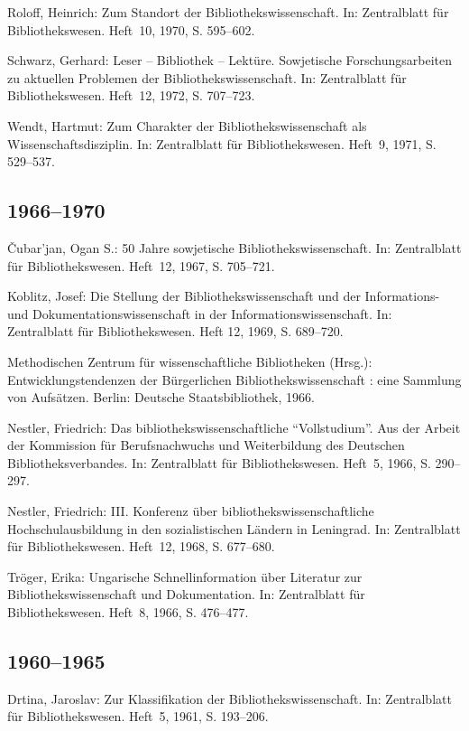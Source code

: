 \documentclass[a4paper,
fontsize=11pt,
oneside,
numbers=noperiodatend,
parskip=half-,
bibliography=totoc,
final
]{scrartcl}
\begin{document}
Roloff, Heinrich: Zum Standort der Bibliothekswissenschaft. In:
Zentralblatt für Bibliothekswesen. Heft~10, 1970, S. 595--602.

Schwarz, Gerhard: Leser -- Bibliothek -- Lektüre. Sowjetische
Forschungsarbeiten zu aktuellen Problemen der Bibliothekswissenschaft.
In: Zentralblatt für Bibliothekswesen. Heft~12, 1972, S. 707--723.

Wendt, Hartmut: Zum Charakter der Bibliothekswissenschaft als
Wissenschaftsdisziplin. In: Zentralblatt für Bibliothekswesen. Heft~9,
1971, S. 529--537.

\hypertarget{section-6}{%
\subsection*{1966--1970}\label{section-6}}

Čubar'jan, Ogan S.: 50 Jahre sowjetische Bibliothekswissenschaft. In:
Zentralblatt für Bibliothekswesen. Heft~12, 1967, S. 705--721.

Koblitz, Josef: Die Stellung der Bibliothekswissenschaft und der
Informations- und Dokumentationswissenschaft in der
Informationswissenschaft. In: Zentralblatt für Bibliothekswesen. Heft
12, 1969, S. 689--720.

Methodischen Zentrum für wissenschaftliche Bibliotheken (Hrsg.):
Entwicklungstendenzen der Bürgerlichen Bibliothekswissenschaft : eine
Sammlung von Aufsätzen. Berlin: Deutsche Staatsbibliothek, 1966.

Nestler, Friedrich: Das bibliothekswissenschaftliche
\enquote{Vollstudium}. Aus der Arbeit der Kommission für Berufsnachwuchs
und Weiterbildung des Deutschen Bibliotheksverbandes. In: Zentralblatt
für Bibliothekswesen. Heft~5, 1966, S. 290--297.

Nestler, Friedrich: III. Konfe­renz über bibliothekswissenschaftliche
Hochschulausbildung in den sozia­listischen Ländern in Leningrad. In:
Zentralblatt für Bibliothekswesen. Heft~12, 1968, S. 677--680.

Tröger, Erika: Ungarische Schnellinformation über Literatur zur
Bibliothekswissenschaft und Dokumentation. In: Zentralblatt für
Bibliothekswesen. Heft~8, 1966, S. 476--477.

\hypertarget{section-7}{%
\subsection*{1960--1965}\label{section-7}}

Drtina, Jaroslav: Zur Klassifikation der Bibliotheks­wissenschaft. In:
Zentralblatt für Bibliothekswesen. Heft~5, 1961, S. 193--206.
\end{document}
